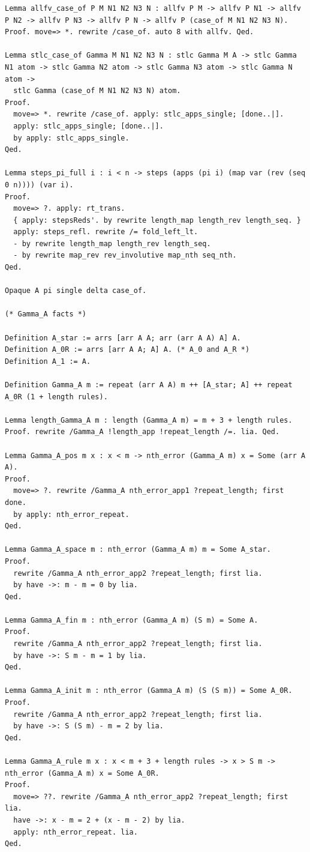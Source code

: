 \documentclass[10pt,a4paper]{amsart}
\begin{document}
\begin{lstlisting}
Lemma allfv_case_of P M N1 N2 N3 N : allfv P M -> allfv P N1 -> allfv P N2 -> allfv P N3 -> allfv P N -> allfv P (case_of M N1 N2 N3 N).
Proof. move=> *. rewrite /case_of. auto 8 with allfv. Qed.

Lemma stlc_case_of Gamma M N1 N2 N3 N : stlc Gamma M A -> stlc Gamma N1 atom -> stlc Gamma N2 atom -> stlc Gamma N3 atom -> stlc Gamma N atom ->
  stlc Gamma (case_of M N1 N2 N3 N) atom.
Proof.
  move=> *. rewrite /case_of. apply: stlc_apps_single; [done..|].
  apply: stlc_apps_single; [done..|].
  by apply: stlc_apps_single.
Qed.

Lemma steps_pi_full i : i < n -> steps (apps (pi i) (map var (rev (seq 0 n)))) (var i).
Proof.
  move=> ?. apply: rt_trans.
  { apply: stepsReds'. by rewrite length_map length_rev length_seq. }
  apply: steps_refl. rewrite /= fold_left_lt.
  - by rewrite length_map length_rev length_seq.
  - by rewrite map_rev rev_involutive map_nth seq_nth.
Qed.

Opaque A pi single delta case_of.

(* Gamma_A facts *)

Definition A_star := arrs [arr A A; arr (arr A A) A] A.
Definition A_0R := arrs [arr A A; A] A. (* A_0 and A_R *)
Definition A_1 := A.

Definition Gamma_A m := repeat (arr A A) m ++ [A_star; A] ++ repeat A_0R (1 + length rules).

Lemma length_Gamma_A m : length (Gamma_A m) = m + 3 + length rules.
Proof. rewrite /Gamma_A !length_app !repeat_length /=. lia. Qed.

Lemma Gamma_A_pos m x : x < m -> nth_error (Gamma_A m) x = Some (arr A A).
Proof.
  move=> ?. rewrite /Gamma_A nth_error_app1 ?repeat_length; first done.
  by apply: nth_error_repeat.
Qed.

Lemma Gamma_A_space m : nth_error (Gamma_A m) m = Some A_star.
Proof.
  rewrite /Gamma_A nth_error_app2 ?repeat_length; first lia.
  by have ->: m - m = 0 by lia.
Qed.

Lemma Gamma_A_fin m : nth_error (Gamma_A m) (S m) = Some A.
Proof.
  rewrite /Gamma_A nth_error_app2 ?repeat_length; first lia.
  by have ->: S m - m = 1 by lia.
Qed.

Lemma Gamma_A_init m : nth_error (Gamma_A m) (S (S m)) = Some A_0R.
Proof.
  rewrite /Gamma_A nth_error_app2 ?repeat_length; first lia.
  by have ->: S (S m) - m = 2 by lia.
Qed.

Lemma Gamma_A_rule m x : x < m + 3 + length rules -> x > S m -> nth_error (Gamma_A m) x = Some A_0R.
Proof.
  move=> ??. rewrite /Gamma_A nth_error_app2 ?repeat_length; first lia.
  have ->: x - m = 2 + (x - m - 2) by lia.
  apply: nth_error_repeat. lia.
Qed.


\end{lstlisting}
\end{document}
